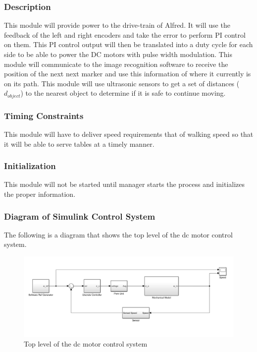 \documentclass [10pt]{article}
\begin{document}
\subsubsection{Description}
This module will provide power to the drive-train of Alfred. It will use the feedback of the left and right encoders and take the error to perform PI control on them. This PI control output will then be translated into a duty cycle for each side to be able to power the DC motors with pulse width modulation. This module will communicate to the image recognition software to receive the position of the next next marker and use this information of where it currently is on its path. This module will use ultrasonic sensors to get a set of distances ($ d_{object} $) to the nearest object to determine if it is safe to continue moving.

\subsubsection{Timing Constraints}
This module will have to deliver speed requirements that of walking speed so that it will be able to serve tables at a timely manner.

\subsubsection{Initialization}
This module will not be started until manager starts the process and initializes the proper information.


\subsubsection{Diagram of Simulink Control System}
The following is a diagram that shows the top level of the dc motor control system. 
\begin{figure} [h!]
	\centering
	\includegraphics [scale = 0.6] {Figures/Simulink.png}
	\caption{Top level of the dc motor control system}
\end{figure}
\end{document}
